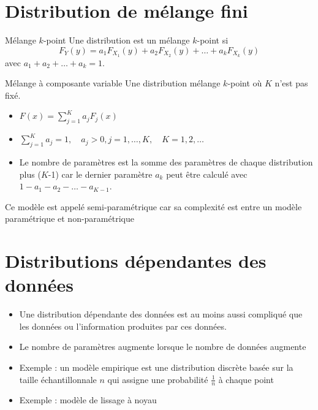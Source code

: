 \section{Distribution de mélange fini}

\begin{definition}{Mélange $k$-point}{}
	Une distribution est un mélange $k$-point si 
	$$F_Y(y) = a_1 F_{X_1}(y) + a_2 F_{X_2}(y) + \dots + a_k F_{X_k}(y)$$
	avec $a_1 + a_2 + \dots + a_k = 1.$
\end{definition}

\begin{definition}{Mélange à composante variable}{}
	Une distribution mélange $k$-point où $K$ n'est pas fixé. 
	\begin{itemize}
		\item $\displaystyle F(x) = \sum_{j = 1}^{K}a_j F_j(x)$
		\item $\displaystyle \sum_{j = 1}^{K}a_j = 1, \quad a_j > 0, j = 1, \dots, K, \quad K = 1, 2, \dots$
		\item Le nombre de paramètres est la somme des paramètres de chaque distribution plus ($K$-1) car le dernier paramètre $a_k$ peut être calculé avec $1 - a_1 - a_2 - \dots - a_{K-1}$.
	\end{itemize}
	Ce modèle est appelé semi-paramétrique car sa complexité est entre un modèle paramétrique et non-paramétrique
\end{definition}

\section{Distributions dépendantes des données}

\begin{itemize}
	\item Une distribution dépendante des données est au moins aussi compliqué que les données ou l'information produites par ces données. 
	\item Le nombre de paramètres augmente lorsque le nombre de données augmente
	\item Exemple : un modèle empirique est une distribution discrète basée sur la taille échantillonnale $n$ qui assigne une probabilité $\frac{1}{n}$ à chaque point
	\item Exemple : modèle de lissage à noyau
\end{itemize}







